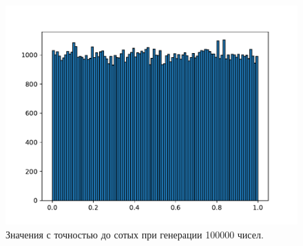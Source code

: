         \begin{figure}[H]
            \centering
            \includegraphics[width=14cm]{pictures/task3_2.pdf}
            \caption{Значения с точностью до сотых при генерации 100000 чисел.}
        \end{figure}
        
        

        